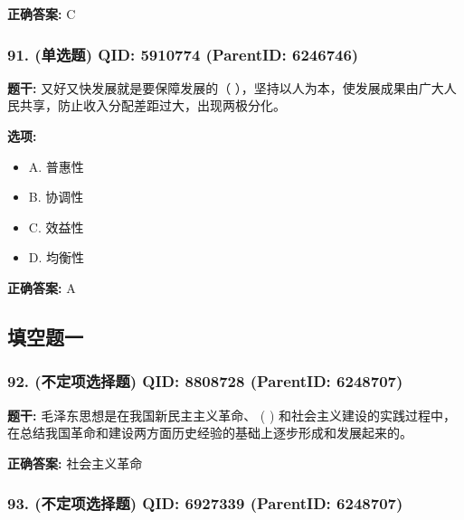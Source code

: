 \documentclass[12pt,UTF8]{ctexart}
\begin{document}
\textbf{正确答案:}
C

\vspace{0.3em}\hrulefill\vspace{0.7em}

\subsubsection*{91. (单选题) \small QID: 5910774 (ParentID: 6246746)}

\textbf{题干:}
又好又快发展就是要保障发展的（ ），坚持以人为本，使发展成果由广大人民共享，防止收入分配差距过大，出现两极分化。



\textbf{选项:}
\begin{itemize}[leftmargin=*]

  \item A. 普惠性

  \item B. 协调性

  \item C. 效益性

  \item D. 均衡性

\end{itemize}

\textbf{正确答案:}
A

\vspace{0.3em}\hrulefill\vspace{0.7em}

\subsection*{填空题一}

\subsubsection*{92. (不定项选择题) \small QID: 8808728 (ParentID: 6248707)}

\textbf{题干:}
毛泽东思想是在我国新民主主义革命、 ( ) 和社会主义建设的实践过程中，在总结我国革命和建设两方面历史经验的基础上逐步形成和发展起来的。



\textbf{正确答案:}
社会主义革命

\vspace{0.3em}\hrulefill\vspace{0.7em}

\subsubsection*{93. (不定项选择题) \small QID: 6927339 (ParentID: 6248707)}
\end{document}
